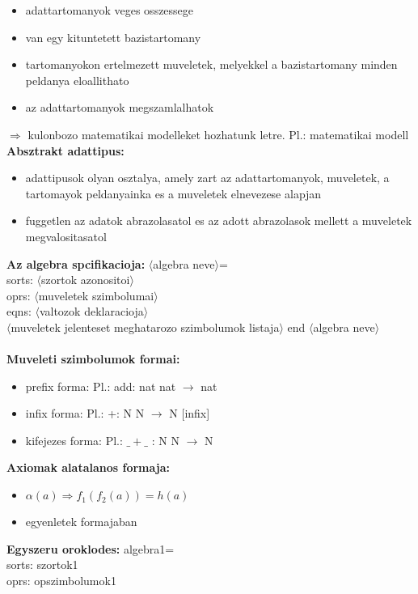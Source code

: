 \documentclass[a4paper,10pt]{article}
\begin{document}
\begin{itemize}
\item adattartomanyok veges osszessege
\item van egy kituntetett bazistartomany
\item tartomanyokon ertelmezett muveletek, melyekkel a bazistartomany minden peldanya eloallithato
\item az adattartomanyok megszamlalhatok 
\end{itemize}
$\Rightarrow$ kulonbozo matematikai modelleket hozhatunk letre. Pl.: matematikai modell\\
\textbf{Absztrakt adattipus:}
\begin{itemize}
\item adattipusok olyan osztalya, amely zart az adattartomanyok, muveletek, a tartomayok peldanyainka es a muveletek elnevezese alapjan
\item fuggetlen az adatok abrazolasatol es az adott abrazolasok mellett a muveletek megvalositasatol
\end{itemize}
\textbf{Az algebra spcifikacioja:}
$\langle$algebra neve$\rangle$=\\
\indent sorts: $\langle$szortok azonositoi$\rangle$\\
\indent oprs:  $\langle$muveletek szimbolumai$\rangle$\\
\indent eqns:  $\langle$valtozok deklaracioja$\rangle$\\
\indent $\langle$muveletek jelenteset meghatarozo szimbolumok listaja$\rangle$
end $\langle$algebra neve$\rangle$\\
\\
\textbf{Muveleti szimbolumok formai:}
\begin{itemize}
\item prefix forma: Pl.: add: nat nat $\to$ nat
\item infix forma: Pl.: +: N N $\to$ N [infix]
\item kifejezes forma: Pl.: $\_+\_$ : N N $\to$ N 
\end{itemize}
\textbf{Axiomak alatalanos formaja:}
\begin{itemize}
\item $\alpha(a) \Rightarrow f_1(f_2(a))=h(a)$
\item egyenletek formajaban
\end{itemize}
\textbf{Egyszeru oroklodes:}
algebra1=\\
\indent sorts: szortok1\\
\indent oprs: opszimbolumok1\\
\end{document}

